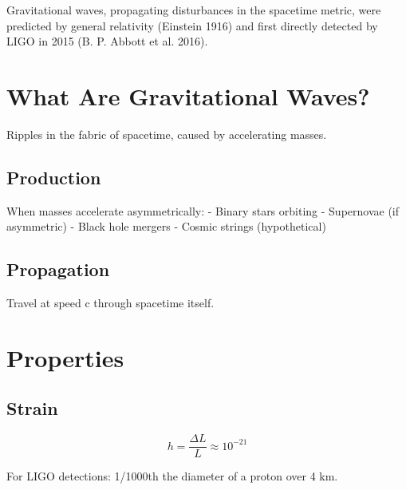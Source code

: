 \documentclass[
  11pt,
  letterpaper,
  twoside,
  openright]{book}
\begin{document}
\begin{tcolorbox}[enhanced jigsaw, leftrule=.75mm, title=\textcolor{quarto-callout-note-color}{\faInfo}\hspace{0.5em}{Key Insight}, bottomrule=.15mm, opacityback=0, coltitle=black, arc=.35mm, colframe=quarto-callout-note-color-frame, colbacktitle=quarto-callout-note-color!10!white, colback=white, titlerule=0mm, breakable, bottomtitle=1mm, toptitle=1mm, rightrule=.15mm, toprule=.15mm, left=2mm, opacitybacktitle=0.6]

Gravitational waves, propagating disturbances in the spacetime metric,
were predicted by general relativity (Einstein 1916) and first directly
detected by LIGO in 2015 (B. P. Abbott et al. 2016).

\end{tcolorbox}

\section{What Are Gravitational
Waves?}\label{what-are-gravitational-waves}

Ripples in the fabric of spacetime, caused by accelerating masses.

\subsection{Production}\label{production}

When masses accelerate asymmetrically: - Binary stars orbiting -
Supernovae (if asymmetric) - Black hole mergers - Cosmic strings
(hypothetical)

\subsection{Propagation}\label{propagation}

Travel at speed c through spacetime itself.

\section{Properties}\label{properties-20}

\subsection{Strain}\label{strain}

\[
h = \frac{\Delta L}{L} \approx 10^{-21}
\]

For LIGO detections: 1/1000th the diameter of a proton over 4 km.
\end{document}
